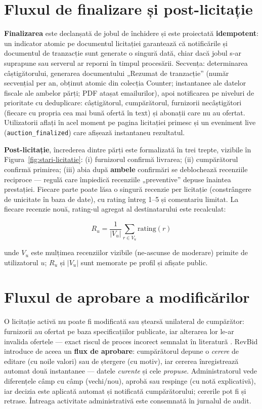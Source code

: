 \section{Fluxul de finalizare și post-licitație}
\label{sec:flux-finalizare}

\textbf{Finalizarea} este declanșată de jobul de închidere și este proiectată \textbf{idempotent}: un indicator atomic pe documentul licitației garantează că notificările și documentul de tranzacție sunt generate o singură dată, chiar dacă jobul s-ar suprapune sau serverul ar reporni în timpul procesării. Secvența: determinarea câștigătorului, generarea documentului „Rezumat de tranzacție'' (număr secvențial per an, obținut atomic din colecția Counter; instantanee ale datelor fiscale ale ambelor părți; PDF atașat emailurilor), apoi notificarea pe niveluri de prioritate cu deduplicare: câștigătorul, cumpărătorul, furnizorii necâștigători (fiecare cu propria cea mai bună ofertă în text) și abonații care nu au ofertat. Utilizatorii aflați în acel moment pe pagina licitației primesc și un eveniment live (\texttt{auction\_finalized}) care afișează instantaneu rezultatul.

\textbf{Post-licitație}, încrederea dintre părți este formalizată în trei trepte, vizibile în Figura~\ref{fig:stari-licitatie}: (i) furnizorul confirmă livrarea; (ii) cumpărătorul confirmă primirea; (iii) abia după \textbf{ambele} confirmări se deblochează recenziile reciproce --- regulă care împiedică recenziile „preventive'' depuse înaintea prestației. Fiecare parte poate lăsa o singură recenzie per licitație (constrângere de unicitate în baza de date), cu rating întreg 1--5 și comentariu limitat. La fiecare recenzie nouă, rating-ul agregat al destinatarului este recalculat:

\begin{equation}
\label{eq:rating}
R_u = \frac{1}{|V_u|} \sum_{r \in V_u} \mathrm{rating}(r)
\end{equation}

unde $V_u$ este mulțimea recenziilor vizibile (ne-ascunse de moderare) primite de utilizatorul $u$; $R_u$ și $|V_u|$ sunt memorate pe profil și afișate public.

\section{Fluxul de aprobare a modificărilor}

O licitație activă nu poate fi modificată sau ștearsă unilateral de cumpărător: furnizorii au ofertat pe baza specificațiilor publicate, iar alterarea lor le-ar invalida ofertele --- exact riscul de proces incorect semnalat în literatură \cite{jap2002}. RevBid introduce de aceea un \textbf{flux de aprobare}: cumpărătorul depune o \textit{cerere} de editare (cu noile valori) sau de ștergere (cu motiv), iar cererea înregistrează automat două instantanee --- datele \textit{curente} și cele \textit{propuse}. Administratorul vede diferențele câmp cu câmp (vechi/nou), aprobă sau respinge (cu notă explicativă), iar decizia este aplicată automat și notificată cumpărătorului; cererile pot fi și retrase. Întreaga activitate administrativă este consemnată în jurnalul de audit.

